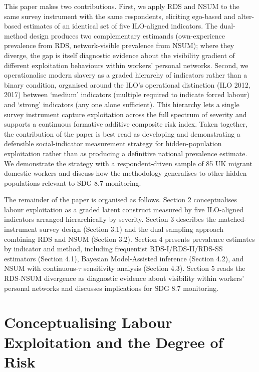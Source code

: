 \documentclass[
  12pt,
  letterpaper,
  DIV=11,
  numbers=noendperiod]{scrartcl}
\begin{document}
This paper makes two contributions. First, we apply RDS and NSUM to the
same survey instrument with the same respondents, eliciting ego-based
and alter-based estimates of an identical set of five ILO-aligned
indicators. The dual-method design produces two complementary estimands
(own-experience prevalence from RDS, network-visible prevalence from
NSUM); where they diverge, the gap is itself diagnostic evidence about
the visibility gradient of different exploitation behaviours within
workers' personal networks. Second, we operationalise modern slavery as
a graded hierarchy of indicators rather than a binary condition,
organised around the ILO's operational distinction (ILO 2012, 2017)
between `medium' indicators (multiple required to indicate forced
labour) and `strong' indicators (any one alone sufficient). This
hierarchy lets a single survey instrument capture exploitation across
the full spectrum of severity and supports a continuous formative
additive composite risk index. Taken together, the contribution of the
paper is best read as developing and demonstrating a defensible
social-indicator measurement strategy for hidden-population exploitation
rather than as producing a definitive national prevalence estimate. We
demonstrate the strategy with a respondent-driven sample of 85 UK
migrant domestic workers and discuss how the methodology generalises to
other hidden populations relevant to SDG 8.7 monitoring.

The remainder of the paper is organised as follows. Section 2
conceptualises labour exploitation as a graded latent construct measured
by five ILO-aligned indicators arranged hierarchically by severity.
Section 3 describes the matched-instrument survey design (Section 3.1)
and the dual sampling approach combining RDS and NSUM (Section 3.2).
Section 4 presents prevalence estimates by indicator and method,
including frequentist RDS-I/RDS-II/RDS-SS estimators (Section 4.1),
Bayesian Model-Assisted inference (Section 4.2), and NSUM with
continuous-\(\tau\) sensitivity analysis (Section 4.3). Section 5 reads
the RDS-NSUM divergence as diagnostic evidence about visibility within
workers' personal networks and discusses implications for SDG 8.7
monitoring.

\section{Conceptualising Labour Exploitation and the Degree of
Risk}\label{conceptualising-labour-exploitation-and-the-degree-of-risk}
\end{document}
